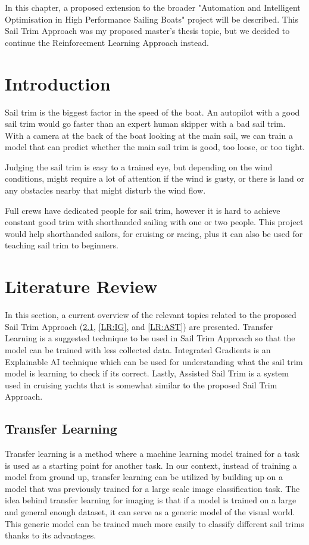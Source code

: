 In this chapter, a proposed extension to the broader "Automation and Intelligent Optimisation in High Performance Sailing Boats" project will be described. This Sail Trim Approach was my proposed master's thesis topic, but we decided to continue the Reinforcement Learning Approach instead.

\section{Introduction}
Sail trim is the biggest factor in the speed of the boat. An autopilot with a good sail trim would go faster than an expert human skipper with a bad sail trim. With a camera at the back of the boat looking at the main sail, we can train a model that can predict whether the main sail trim is good, too loose, or too tight.

Judging the sail trim is easy to a trained eye, but depending on the wind conditions, might require a lot of attention if the wind is gusty, or there is land or any obstacles nearby that might disturb the wind flow.
 
Full crews have dedicated people for sail trim, however it is hard to achieve constant good trim with shorthanded sailing with one or two people. This project would help shorthanded sailors, for cruising or racing, plus it can also be used for teaching sail trim to beginners.


\section{Literature Review}
In this section, a current overview of the relevant topics related to the proposed Sail Trim Approach (\ref{LR:TL}, \ref{LR:IG}, and \ref{LR:AST}) are presented. Transfer Learning is a suggested technique to be used in Sail Trim Approach so that the model can be trained with less collected data. Integrated Gradients is an Explainable AI technique which can be used for understanding what the sail trim model is learning to check if its correct. Lastly, Assisted Sail Trim is a system used in cruising yachts that is somewhat similar to the proposed Sail Trim Approach.

\subsection{Transfer Learning} \label{LR:TL}
Transfer learning is a method where a machine learning model trained for a task is used as a starting point for another task.\cite{brownlee_2019} In our context, instead of training a model from ground up, transfer learning can be utilized by building up on a model that was previously trained for a large scale image classification task. The idea behind transfer learning for imaging is that if a model is trained on a large and general enough dataset, it can serve as a generic model of the visual world. \cite{TF:TL} This generic model can be trained much more easily to classify different sail trims thanks to its advantages. 

